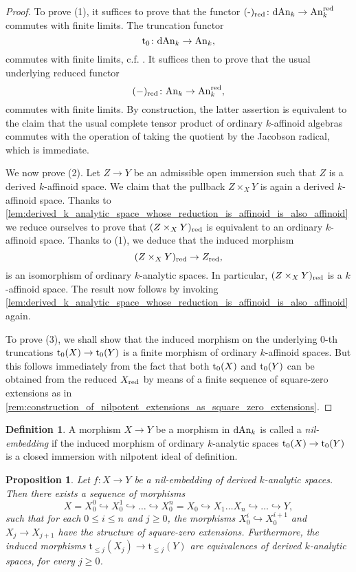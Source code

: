 \documentclass[10pt,a4paper,reqno]{amsart} %
\theoremstyle{plain}
\newtheorem{prop}[thm]{Proposition}
\theoremstyle{definition}
\newtheorem{defin}[thm]{Definition}
\theoremstyle{remark}
\numberwithin{equation}{section}
\begin{document}
\begin{proof} To prove (1), it suffices to prove that
    the functor $(\textrm{-})_{\mathrm{red}} \colon \mathrm{dAn}_k \to \mathrm{An}_k^{\mathrm{red}}$ commutes with finite limits. The truncation functor
        \[
            \mathrm{t}_0 \colon \mathrm{dAn}_k \to \mathrm{An}_k,  
        \]
    commutes with finite limits, c.f. \cite[Proposition 6.2 (5)]{Porta_Yu_Derived_non-archimedean_analytic_spaces}. It suffices then to prove that the usual underlying reduced functor
        \[
            (-)_{\mathrm{red}} \colon \mathrm{An}_k \to \mathrm{An}_k^{\mathrm{red}},
        \]
    commutes with finite limits. By construction,
    the latter assertion is equivalent to the claim that
    the usual complete tensor product of ordinary $k$-affinoid algebras commutes with the operation of taking the quotient by the Jacobson radical, which is immediate.

    We now prove (2). Let $Z \to Y$ be an admissible open immersion such that $Z$ is a derived $k$-affinoid space. We claim that the pullback
    $Z \times_X Y$ is again a derived $k$-affinoid space. Thanks to \cref{lem:derived_k_analytic_space_whose_reduction_is_affinoid_is_also_affinoid}
    we reduce ourselves to prove that $(Z \times_X Y)_{\mathrm{red}}$ is equivalent to an
    ordinary $k$-affinoid space. Thanks to (1), we deduce that the induced morphism
        \[
            (Z \times_X Y)_{\mathrm{red}} \to Z_{\mathrm{red}},  
        \]
    is an isomorphism of ordinary $k$-analytic spaces. In particular, $(Z \times_X Y)_{\mathrm{red}}$ is a $k$-affinoid space. The result now follows by invoking
    \cref{lem:derived_k_analytic_space_whose_reduction_is_affinoid_is_also_affinoid} again.

    To prove (3), we shall show that the induced morphism on the underlying $0$-th truncations $\mathrm{t}_0(X) \to \mathrm{t}_0(Y)$ is a finite morphism of ordinary $k$-affinoid spaces.
    But this follows immediately from the fact that both $\mathrm{t}_0(X)$ and $\mathrm{t}_0(Y)$ can be obtained from the reduced $X_{\mathrm{red}}$ by means of a finite sequence of square-zero extensions
    as in \cref{rem:construction_of_nilpotent_extensions_as_square_zero_extensions}.
\end{proof}


\begin{defin}
    A morphism $X \to Y$ be a morphism in $\mathrm{dAn}_k$ is called a \emph{nil-embedding} if the induced morphism of ordinary $k$-analytic spaces
    $\mathrm{t}_0(X) \to \mathrm{t}_0(Y)$ is a closed immersion with nilpotent ideal of definition. 
\end{defin}

\begin{prop} \label{prop:filtered_colimit_for_nil-embeddings}
    Let $f \colon X \to Y$ be a nil-embedding of derived $k$-analytic spaces. Then there exists a sequence of morphisms
        \[X = X_0^0 \hookrightarrow X_0^1 \hookrightarrow \dots \hookrightarrow X_0^n = X_0 
        \hookrightarrow X_1 \dots X_n \hookrightarrow \dots \hookrightarrow Y,\]
    such that for each $0 \le i \le n$ and $j \ge 0$, the morphisms $X_0^i \hookrightarrow X_0^{i+1}$ and $X_j \to X_{j+1}$ have the structure of square-zero extensions.
    Furthermore, the induced morphisms $\mathrm{t}_{\le j}(X_j) \to \mathrm{t}_{\le j}(Y)$ are equivalences of derived
    $k$-analytic spaces, for every $j \ge 0$.
\end{prop}
\end{document}
